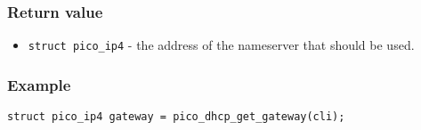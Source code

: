 \subsubsection*{Return value}
\begin{itemize}[noitemsep]
\item \texttt{struct pico\_ip4} - the address of the nameserver that should be used. 
\end{itemize}



\subsubsection*{Example}
\begin{verbatim}
struct pico_ip4 gateway = pico_dhcp_get_gateway(cli);
\end{verbatim}
